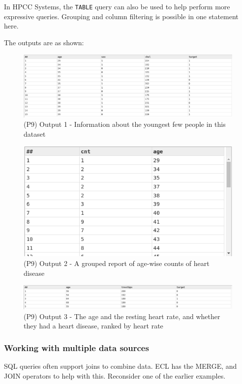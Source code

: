 \documentclass[a4paper,oneside,12pt]{book}
\begin{document}
In HPCC Systems, the \lstinline{TABLE} query can also be used to help perform more expressive queries. Grouping and column filtering is possible in one statement here.



The outputs are as shown:

\begin{figure}[h]
    \centering
    \includegraphics[width=.75\linewidth]{../output/63/1.png}
    \caption{(P9) Output 1 - Information about the youngest few people in this dataset}
\end{figure}

\begin{figure}[h]
    \centering
    \includegraphics[width=.5\linewidth]{../output/63/2}
    \caption{(P9) Output 2 - A grouped report of age-wise counts of heart disease}
\end{figure}
\begin{figure}[h]
    \centering
    \includegraphics[width=.75\linewidth]{../output/63/3}
    \caption{(P9) Output 3 - The age and the resting heart rate, and whether they had a heart disease, ranked by heart rate}
\end{figure}

\subsubsection{Working with multiple data sources}

SQL queries often support joins to combine data. ECL has the MERGE, and JOIN operators to help with this. Reconsider one of the earlier examples.
\end{document}
